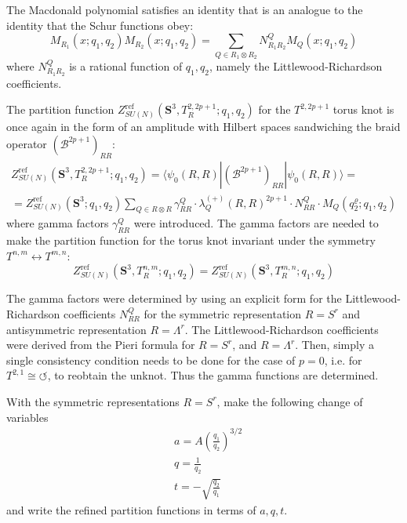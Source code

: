 \documentclass[a4paper,titlepage,twoside]{book}
\begin{document}
The Macdonald polynomial satisfies an identity that is an analogue to the identity that the Schur functions obey:
\begin{equation}
M_{R_1}{ (x;q_1, q_2) }M_{R_2}{ (x;q_1,q_2) } = \sum_{ Q \in R_1 \otimes R_2 }N^Q_{R_1R_2}M_Q{ (x;q_1,q_2) }
\end{equation}
where $N_{R_1R_2}^Q$ is a rational function of $q_1,q_2$, namely the Littlewood-Richardson coefficients.  

The partition function $Z^{\text{ref}}_{SU(N)}{ ( \mathbf{S}^3, T_R^{2,2p+1};q_1,q_2) }$ for the $T^{2,2p+1}$ torus knot is once again in the form of an amplitude with Hilbert spaces sandwiching the braid operator $(\mathcal{B}^{2p+1})_{RR}$:
\begin{equation}
\begin{gathered}
  Z^{\text{ref}}_{SU{(N)} }{ ( \mathbf{S}^3, T_R^{2,2p+1};q_1,q_2)  } = \langle \psi_0(R,R) | (\mathcal{B}^{2p+1})_{RR} | \psi_0(R,R) \rangle =    \\
    = Z^{\text{ref}}_{ SU{(N)} }{ (\mathbf{S}^3;q_1,q_2) } \sum_{ Q \in R\otimes R} \gamma^Q_{RR} \cdot \lambda_Q^{ (+)}{ (R,R)}^{2p+1} \cdot N^Q_{RR} \cdot M_Q{ (q^{\varrho}_2;q_1,q_2)}  
\end{gathered}  \label{eq:ZrefTorus00}
\end{equation}
where gamma factors $\gamma^Q_{RR}$ were introduced.  The gamma factors are needed to make the partition function for the torus knot invariant under the symmetry $T^{n,m} \leftrightarrow T^{m,n}$:
\begin{equation}
Z^{\text{ref}}_{ SU{(N)} }{ (\mathbf{S}^3, T^{n,m}_R;q_1,q_2) } = Z^{\text{ref}}_{  SU{(N)} }{ (\mathbf{S}^3, T^{m,n}_R; q_1,q_2) }
\end{equation}

The gamma factors were determined \cite{FujiGukovSulkowski2012} by using an explicit form for the Littlewood-Richardson coefficients $N^Q_{RR}$ for the symmetric representation $R=S^r$ and antisymmetric representation $R= \Lambda^r$.  The Littlewood-Richardson coefficients were derived from the Pieri formula for $R=S^r$, and $R=\Lambda^r$.   Then, simply a single consistency condition needs to be done for the case of $p=0$, i.e. for $T^{2,1} \cong \circlearrowleft$, to reobtain the unknot.  Thus the gamma functions are determined.

With the symmetric representations $R=S^r$, make the following change of variables
\begin{equation}
  \begin{aligned}
    & a = A \left( \frac{q_1}{q_2} \right)^{3/2} \\ 
    & q = \frac{1}{q_2 } \\
    & t = - \sqrt{ \frac{q_2}{q_1 } }
\end{aligned}
\end{equation}
and write the refined partition functions in terms of $a,q,t$.  
\end{document}

